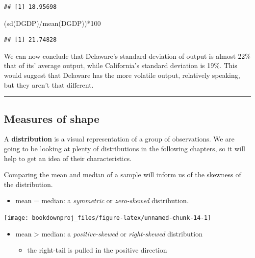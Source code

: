 \documentclass[
]{book}
\newenvironment{Shaded}{\begin{snugshade}}{\end{snugshade}}
\newcommand{\DecValTok}[1]{\textcolor[rgb]{0.00,0.00,0.81}{#1}}
\newcommand{\FunctionTok}[1]{\textcolor[rgb]{0.00,0.00,0.00}{#1}}
\newcommand{\NormalTok}[1]{#1}
\newcommand{\SpecialCharTok}[1]{\textcolor[rgb]{0.00,0.00,0.00}{#1}}
\providecommand{\tightlist}{%
  \setlength{\itemsep}{0pt}\setlength{\parskip}{0pt}}
\begin{document}
\begin{verbatim}
## [1] 18.95698
\end{verbatim}

\begin{Shaded}
\begin{Highlighting}[]
\NormalTok{(}\FunctionTok{sd}\NormalTok{(DGDP)}\SpecialCharTok{/}\FunctionTok{mean}\NormalTok{(DGDP))}\SpecialCharTok{*}\DecValTok{100}
\end{Highlighting}
\end{Shaded}

\begin{verbatim}
## [1] 21.74828
\end{verbatim}

We can now conclude that Delaware's standard deviation of output is almost 22\% that of its' average output, while California's standard deviation is 19\%. This would suggest that Delaware has the more volatile output, relatively speaking, but they aren't that different.

\begin{center}\rule{0.5\linewidth}{0.5pt}\end{center}

\hypertarget{measures-of-shape}{%
\subsection{Measures of shape}\label{measures-of-shape}}

A \textbf{distribution} is a visual representation of a group of observations. We are going to be looking at plenty of distributions in the following chapters, so it will help to get an idea of their characteristics.

Comparing the mean and median of a sample will inform us of the skewness of the distribution.

\begin{itemize}
\tightlist
\item
  mean = median: a \emph{symmetric} or \emph{zero-skewed} distribution.
\end{itemize}

\begin{center}\texttt{[image: bookdownproj\_files/figure-latex/unnamed-chunk-14-1]} \end{center}

\begin{itemize}
\item
  mean \textgreater{} median: a \emph{positive-skewed} or \emph{right-skewed} distribution

  \begin{itemize}
  \tightlist
  \item
    the right-tail is pulled in the positive direction
  \end{itemize}
\end{itemize}
\end{document}
